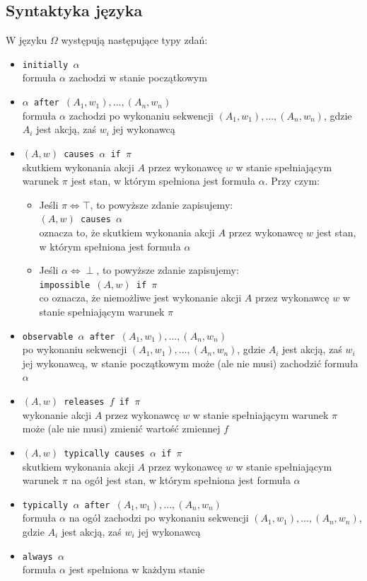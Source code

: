\documentclass{article}
\begin{document}
\subsection{Syntaktyka języka} 
W języku  $\Omega$ występują następujące typy zdań:
\begin{itemize}
\item {\large\texttt{initially $\alpha$}}\\
formuła $\alpha$ zachodzi w stanie początkowym
\item {\large\texttt{$\alpha$ after $(A_{1},w_{1}), ..., (A_{n},w_{n})$}}\\
formuła $\alpha$ zachodzi po wykonaniu sekwencji $(A_{1},w_{1}), ..., (A_{n},w_{n})$, gdzie $A_{i}$ jest akcją, zaś $w_{i}$ jej wykonawcą
\item {\large\texttt{$(A,w)$ causes $\alpha$ if $\pi$}}\\
skutkiem wykonania akcji $A$ przez wykonawcę $w$ w stanie spełniającym warunek $\pi$ jest stan, w którym spełniona jest formuła $\alpha$. Przy czym:
\begin{itemize}
    \item Jeśli $\pi \Leftrightarrow \top$, to powyższe zdanie zapisujemy:\\
    {\large\texttt{$(A,w)$ causes $\alpha$ }}\\
    oznacza to, że skutkiem wykonania akcji $A$ przez wykonawcę $w$ jest stan, w którym spełniona jest formuła $\alpha$
    \item Jeśli $\alpha \Leftrightarrow \perp$, to powyższe zdanie zapisujemy:\\
    {\large\texttt{impossible $(A,w)$ if $\pi$}}\\
    co oznacza, że niemożliwe jest wykonanie akcji $A$ przez wykonawcę $w$ w stanie spełniającym warunek $\pi$
\end{itemize}
\item {\large\texttt{observable $\alpha$ after $(A_{1},w_{1}), ..., (A_{n},w_{n})$}}\\
po wykonaniu sekwencji $(A_{1},w_{1}), ..., (A_{n},w_{n})$, gdzie $A_{i}$ jest akcją, zaś $w_{i}$ jej wykonawcą, w stanie początkowym może (ale nie musi) zachodzić formuła $\alpha$
\item {\large\texttt{$(A,w)$ releases $f$ if $\pi$}}\\
wykonanie akcji $A$ przez wykonawcę $w$ w stanie spełniającym warunek $\pi$ może (ale nie musi) zmienić wartość zmiennej $f$
\item {\large\texttt{$(A,w)$ typically causes $\alpha$ if $\pi$}}\\
skutkiem wykonania akcji $A$ przez wykonawcę $w$ w stanie spełniającym warunek $\pi$ na ogół jest stan, w którym spełniona jest formuła $\alpha$
\item {\large\texttt{typically $\alpha$ after $(A_{1},w_{1}), ..., (A_{n},w_{n})$}}\\
formuła $\alpha$ na ogół zachodzi po wykonaniu sekwencji $(A_{1},w_{1}), ..., (A_{n},w_{n})$, gdzie $A_{i}$ jest akcją, zaś $w_{i}$ jej wykonawcą
\item {\large\texttt{always $\alpha$}}\\
formuła $\alpha$ jest spełniona w każdym stanie
\end{itemize}
\end{document}
